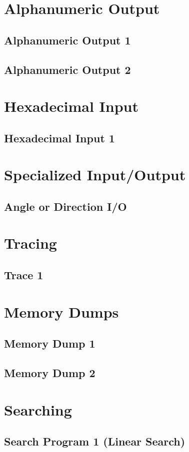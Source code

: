 \documentclass{article}
\begin{document}
\begin{enumerate}
\section{Alphanumeric Output}
\subsection{Alphanumeric Output 1}
\subsection{Alphanumeric Output 2}
\section{Hexadecimal Input}
\subsection{Hexadecimal Input 1}
\section{Specialized Input/Output}
\subsection{Angle or Direction I/O}
\section{Tracing}
\subsection{Trace 1}
\section{Memory Dumps}
\subsection{Memory Dump 1}
\subsection{Memory Dump 2}
\section{Searching}
\subsection{Search Program 1 (Linear Search)}

\end{enumerate}
\end{document}
